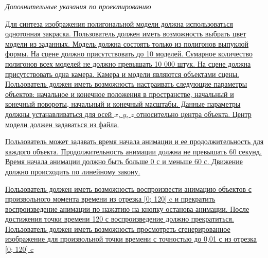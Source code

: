 
\clearpage
\thispagestyle{empty}

\begin{center}
    \fontsize{12pt}{\baselineskip}\selectfont
    \textit{Дополнительные указания по проектированию}
\end{center}

\begingroup
\fontsize{12pt}{0.7\baselineskip}\selectfont
\setlength{\parskip}{0em}
\setlength{\parindent}{0em}

\uline{\mbox{\hspace*{1.25cm}} Для синтеза изображения полигональной модели должна использоваться однотонная закраска. Пользователь должен иметь возможность выбрать цвет модели из заданных. Модель должна состоять только из полигонов выпуклой формы. На сцене должно присутствовать до 10 моделей. Сумарное количество полигонов всех моделей не должно превышать 10 000 штук. На сцене должна присутствовать одна камера. Камера и модели являются объектами сцены. Пользователь должен иметь возможность настраивать следующие параметры объектов: начальное и конечное положения в пространстве, начальный и конечный повороты, начальный и конечный масштабы. Данные параметры должны устанавливаться для осей $x$, $y$, $z$ относительно центра объекта. Центр модели должен задаваться из файла.
    \hfill
}


\uline{\mbox{\hspace*{1.25cm}} Пользователь может задавать время начала анимации и ее продолжительность для каждого объекта. Продолжительность анимации должна не превышать 60 секунд. Время начала анимации должно быть больше 0 с и меньше 60 с. Движение должно происходить по линейному закону.\hfill}


\uline{\mbox{\hspace*{1.25cm}} Пользователь должен иметь возможность воспроизвести анимацию объектов с произвольного момента времени из отрезка [0; 120] c  и прекратить воспроизведение анимации по нажатию на кнопку останова анимации. После достижения точки времени 120 с воспроизведение должно прекратиться. Пользователь должен иметь возможность просмотреть сгенерированное изображение для произвольной точки времени с точностью до 0,01 с из отрезка [0; 120] c \hfill}


\endgroup
\normalsize
